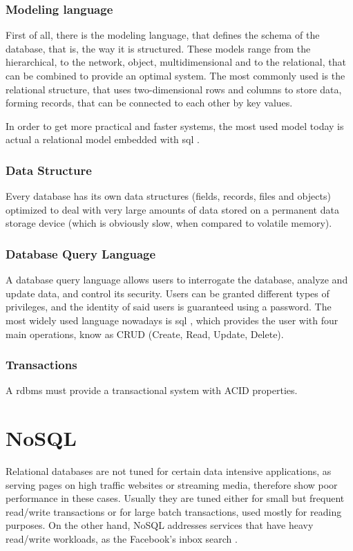 \subsubsection{Modeling language}
First of all, there is the modeling language, that defines the schema of the database, that is, the way it is structured. These models range from the hierarchical, to the network, object, multidimensional and to the relational, that can be combined to provide an optimal system. The most commonly used is the relational structure, that uses two-dimensional rows and columns to store data, forming records, that can be connected to each other by key values. 

In order to get more practical and faster systems, the most used model today is actual a relational model embedded with \ac{sql} .

\subsubsection{Data Structure}
Every database has its own data structures (fields, records, files and objects) optimized to deal with very large amounts of data stored on a permanent data storage device (which is obviously slow, when compared to volatile memory).

\subsubsection{Database Query Language}
A database query language allows users to interrogate the database, analyze and update data, and control its security. Users can be granted different types of privileges, and the identity of said users is guaranteed using a password. The most widely used language nowadays is \ac{sql} , which provides the user with four main operations, know as CRUD (Create, Read, Update, Delete).  

\subsubsection{Transactions}
A \ac{rdbms} must provide a transactional system with ACID properties.

\section{NoSQL}
\label{sec:nosql}
Relational databases are not tuned for certain data intensive applications, as serving pages on high traffic websites or streaming media, therefore show poor performance in these cases. Usually they are tuned either for small but frequent read/write transactions or for large batch transactions, used mostly for reading purposes. On the other hand, NoSQL addresses services that have heavy read/write workloads, as the Facebook's inbox search \cite{lakshmanMalik}.

